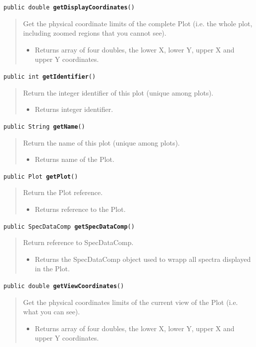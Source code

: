 \documentclass[twoside,11pt]{article}
\renewcommand{\_}{\texttt{\symbol{95}}}
\newcommand{\method}[1]{\texttt{#1}}
\newenvironment{desc}{\begin{quote}}{\end{quote}}
\begin{document}
\method{public double \textbf{getDisplayCoordinates}()\label{l164}\label{l165}}
\begin{desc}Get the physical coordinate limits of the complete Plot
 (i.e. the whole plot, including zoomed regions that you cannot
 see).
\begin{itemize}
\item{Returns array of four doubles, the lower X, lower Y, upper X
         and upper Y coordinates. }
\end{itemize}
\end{desc}

\method{public int \textbf{getIdentifier}()\label{l166}\label{l167}}
\begin{desc}Return the integer identifier of this plot (unique among plots).
\begin{itemize}
\item{Returns integer identifier. }
\end{itemize}
\end{desc}

\method{public String \textbf{getName}()\label{l168}\label{l169}}
\begin{desc}Return the name of this plot (unique among plots).
\begin{itemize}
\item{Returns name of the Plot. }
\end{itemize}
\end{desc}

\method{public Plot \textbf{getPlot}()\label{l170}\label{l171}}
\begin{desc}Return the Plot reference.
\begin{itemize}
\item{Returns reference to the Plot. }
\end{itemize}
\end{desc}

\method{public SpecDataComp \textbf{getSpecDataComp}()\label{l172}\label{l173}}
\begin{desc}Return reference to SpecDataComp.
\begin{itemize}
\item{Returns the SpecDataComp object used to wrapp all spectra
         displayed in the Plot. }
\end{itemize}
\end{desc}

\method{public double \textbf{getViewCoordinates}()\label{l174}\label{l175}}
\begin{desc}Get the physical coordinates limits of the current view of the
 Plot (i.e. what you can see).
\begin{itemize}
\item{Returns array of four doubles, the lower X, lower Y, upper X
         and upper Y coordinates. }
\end{itemize}
\end{desc}
\end{document}
